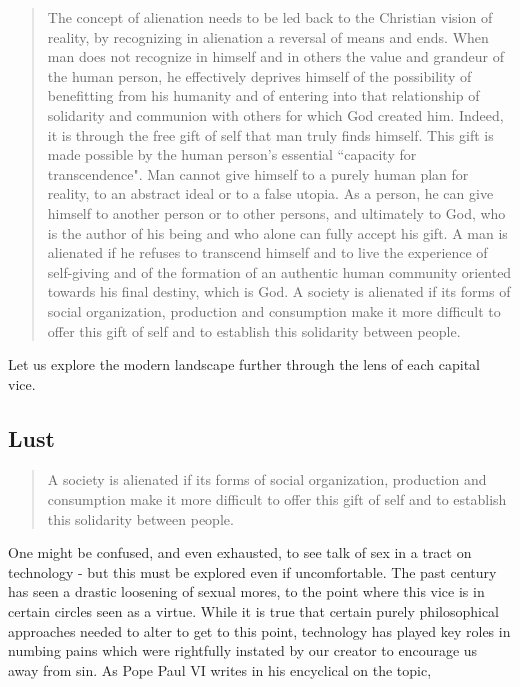 \documentclass[letterpaper]{article}
\begin{document}
\begin{quote}
  The concept of alienation needs to be led back to the Christian vision of reality, by recognizing in alienation a reversal of means and ends. When man does not recognize in himself and in others the value and grandeur of the human person, he effectively deprives himself of the possibility of benefitting from his humanity and of entering into that relationship of solidarity and communion with others for which God created him. Indeed, it is through the free gift of self that man truly finds himself. This gift is made possible by the human person's essential ``capacity for transcendence". Man cannot give himself to a purely human plan for reality, to an abstract ideal or to a false utopia. As a person, he can give himself to another person or to other persons, and ultimately to God, who is the author of his being and who alone can fully accept his gift. A man is alienated if he refuses to transcend himself and to live the experience of self-giving and of the formation of an authentic human community oriented towards his final destiny, which is God. A society is alienated if its forms of social organization, production and consumption make it more difficult to offer this gift of self and to establish this solidarity between people.
\end{quote}

Let us explore the modern landscape further through the lens of each capital vice.

\subsection{Lust}

\begin{quote}
  A society is alienated if its forms of social organization, production and consumption make it more difficult to offer this gift of self and to establish this solidarity between people.
\end{quote}

One might be confused, and even exhausted, to see talk of sex in a tract on technology - but this must be explored even if uncomfortable. The past century has seen a drastic loosening of sexual mores, to the point where this vice is in certain circles seen as a virtue. While it is true that certain purely philosophical approaches needed to alter to get to this point, technology has played key roles in numbing pains which were rightfully instated by our creator to encourage us away from sin. As Pope Paul VI writes in his encyclical on the topic,
\end{document}
